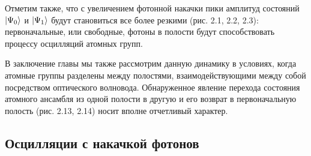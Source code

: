 Отметим также, что с увеличением фотонной накачки пики амплитуд состояний $|\Psi_{0}\rangle$ и $|\Psi_{1}\rangle$ будут становиться все более резкими ({\color{red}рис. 2.1, 2.2, 2.3}): первоначальные, или свободные, фотоны в полости будут способствовать процессу осцилляций атомных групп.

В заключение главы мы также рассмотрим данную динамику в условиях, когда атомные группы разделены между полостями, взаимодействующими между собой посредством оптического волновода. Обнаруженное явление перехода состояния атомного ансамбля из одной полости в другую и его возврат в первоначальную полость ({\color{red}рис. 2.13, 2.14}) носит вполне отчетливый характер.

\clearpage
\subsection{Осцилляции с накачкой фотонов}
\vspace{-1em}
\begin{figure}[h!]
	\noindent{}
\end{figure}

